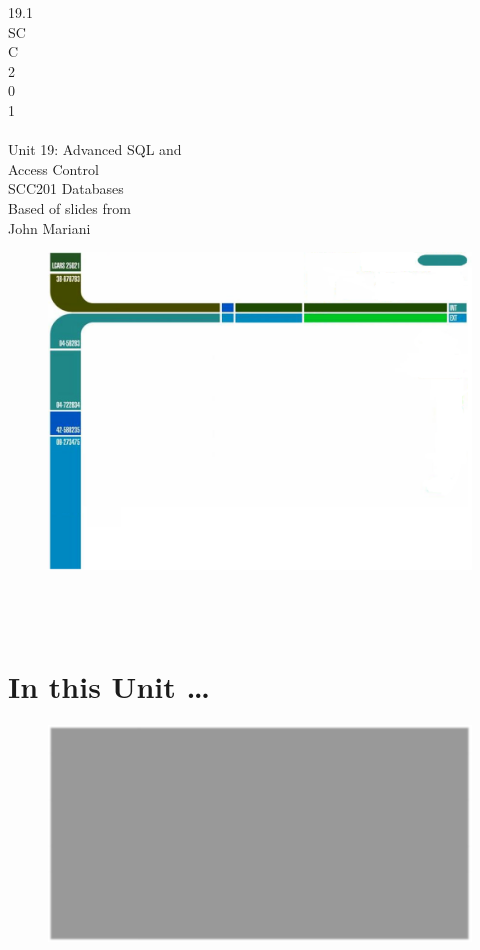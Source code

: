 \documentclass[12pt]{article}
\begin{document}
19.1\\
SC\\
C\\
 2\\
0\\
1\\
 \\
Unit 19: Advanced SQL and \\
Access Control\\
SCC201 Databases\\
Based of slides from\\
John Mariani\\
\begin{figure}
\includegraphics[width=\linewidth]{page13-image-1.png}
\end{figure}
\\ 
 \\
\section{In this Unit …}
\begin{figure}
\includegraphics[width=\linewidth]{page20-image-2.png}
\end{figure}
\\ 
 \\
\end{document}

